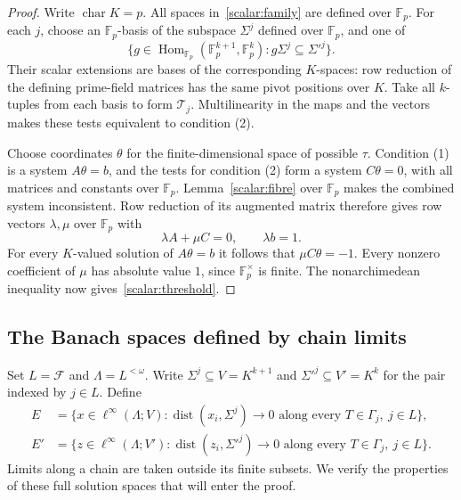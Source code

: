 \documentclass[11pt]{amsart}
\theoremstyle{definition}
\theoremstyle{remark}
\numberwithin{equation}{section}
\newcommand{\F}{\mathbb F}
\newcommand{\linf}{\ell^\infty}
\theoremstyle{plain}
\theoremstyle{definition}
\theoremstyle{plain}
\begin{document}
\begin{proof}
Write $\operatorname{char}K=p$. All spaces in~\eqref{scalar:family} are defined over $\F_p$.
For each $j$, choose an $\F_p$\nobreakdash-basis of the subspace $\Sigma^j$ defined over $\F_p$, and one of
\[
 \{g\in\operatorname{Hom}_{\F_p}(\F_p^{k+1},\F_p^k):g\Sigma^j\subseteq\Sigma'^j\}.
\]
Their scalar extensions are bases of the corresponding $K$\nobreakdash-spaces: row reduction of the
defining prime-field matrices has the same pivot positions over $K$. Take all $k$\nobreakdash-tuples from
each basis to form $\mathcal T_j$. Multilinearity in the maps and the vectors makes these tests equivalent
to condition (2).

Choose coordinates $\theta$ for the finite-dimensional space of possible $\tau$. Condition (1) is a
system $A\theta=b$, and the tests for condition (2) form a system $C\theta=0$, with all matrices and
constants over $\F_p$. Lemma~\ref{scalar:fibre} over $\F_p$ makes the combined system inconsistent.
Row reduction of its augmented matrix therefore gives row vectors $\lambda,\mu$ over $\F_p$ with
\[
 \lambda A+\mu C=0,\qquad \lambda b=1.
\]
For every $K$\nobreakdash-valued solution of $A\theta=b$ it follows that $\mu C\theta=-1$.
Every nonzero coefficient of $\mu$ has absolute value $1$, since $\F_p^\times$ is finite.
The nonarchimedean inequality now gives~\eqref{scalar:threshold}.
\end{proof}

\subsection{The Banach spaces defined by chain limits}

Set $L=\mathcal F$ and $\Lambda=L^{<\omega}$. Write $\Sigma^j\subseteq V=K^{k+1}$ and
$\Sigma'^j\subseteq V'=K^k$ for the pair indexed by $j\in L$. Define
\begin{equation}\label{scalar:spaces}
 \begin{split}
 E&=\{x\in\linf(\Lambda;V):
       \operatorname{dist}(x_i,\Sigma^j)\longrightarrow0
       \text{ along every }T\in\Gamma_j,\ j\in L\},\\
 E'&=\{z\in\linf(\Lambda;V'):
       \operatorname{dist}(z_i,\Sigma'^j)\longrightarrow0
       \text{ along every }T\in\Gamma_j,\ j\in L\}.
 \end{split}
\end{equation}
Limits along a chain are taken outside its finite subsets. We verify the properties of these full
solution spaces that will enter the proof.
\end{document}
